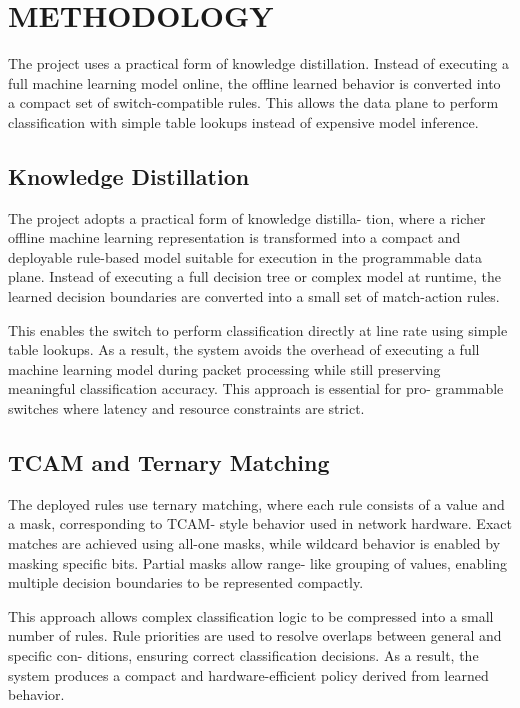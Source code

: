\documentclass[conference]{IEEEtran}
\begin{document}
\section{METHODOLOGY}

The project uses a practical form of knowledge distillation.
Instead of executing a full machine learning model online,
the offline learned behavior is converted into a compact set of
switch-compatible rules. This allows the data plane to perform
classification with simple table lookups instead of expensive
model inference.

\subsection{Knowledge Distillation}

The project adopts a practical form of knowledge distilla-
tion, where a richer offline machine learning representation is
transformed into a compact and deployable rule-based model
suitable for execution in the programmable data plane. Instead
of executing a full decision tree or complex model at runtime,
the learned decision boundaries are converted into a small set
of match-action rules.

This enables the switch to perform classification directly at
line rate using simple table lookups. As a result, the system
avoids the overhead of executing a full machine learning model
during packet processing while still preserving meaningful
classification accuracy. This approach is essential for pro-
grammable switches where latency and resource constraints
are strict.

\subsection{TCAM and Ternary Matching}

The deployed rules use ternary matching, where each rule
consists of a value and a mask, corresponding to TCAM-
style behavior used in network hardware. Exact matches are
achieved using all-one masks, while wildcard behavior is
enabled by masking specific bits. Partial masks allow range-
like grouping of values, enabling multiple decision boundaries
to be represented compactly.

This approach allows complex classification logic to be
compressed into a small number of rules. Rule priorities are
used to resolve overlaps between general and specific con-
ditions, ensuring correct classification decisions. As a result,
the system produces a compact and hardware-efficient policy
derived from learned behavior.
\end{document}
